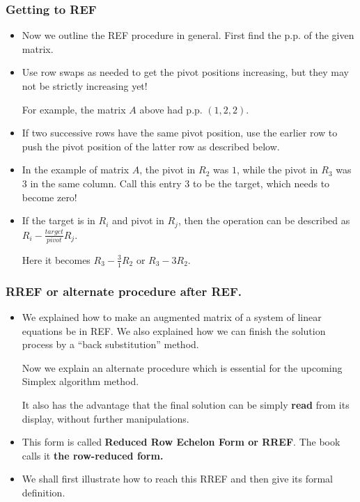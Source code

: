 \begin{frame}%
  \frametitle{Getting to REF}
  \begin{itemize}%
 
\item Now we outline the REF procedure in general.
First find the p.p. of the given matrix.

\item Use row swaps as needed to get the pivot positions increasing, but
they may not be strictly increasing yet!

For example, the matrix $A$ above had p.p. $(1,2,2)$.

\item If two successive rows have the same pivot position, use the
earlier row to push the pivot position of the latter row as described
below.

\item In the example of matrix $A$, the pivot in $R_2$ was $1$, while
the pivot in $R_3$ was $3$ in the same column. Call this entry $3$ to be
the target, which needs to become zero!

\item If the target is in $R_i$ and pivot in $R_j$, then
the operation can be described as $R_i - \frac{target}{pivot}R_j$.

Here it becomes $R_3-\frac{3}{1}R_2$ or $R_3-3R_2$.

\end{itemize}
\end{frame}


\begin{frame}%
  \frametitle{RREF or alternate procedure after REF.}
  \begin{itemize}%
 
\item We explained how to make an augmented matrix of a system of linear
equations be in REF. We also explained how we can finish the solution
process by a ``back substitution'' method.


Now we explain an alternate procedure which is essential for the upcoming
Simplex algorithm method.

It also has the advantage that the final solution can be simply {\bf
read} from its display, without further manipulations.


\item This form is called {\bf Reduced Row Echelon Form or RREF}. The
book calls it {\bf the row-reduced form.}

\item We shall first illustrate how to reach this RREF and then give its
formal definition.


\end{itemize}
\end{frame}

